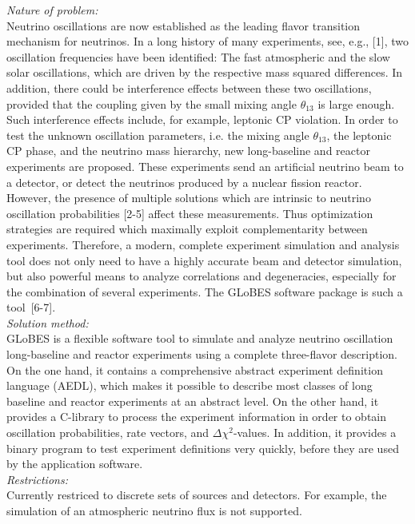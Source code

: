 \documentclass{elsart}
\begin{document}
\begin{small}
{\em Nature of problem:}\\
  Neutrino oscillations are now established as the leading flavor
transition mechanism for neutrinos. In a long history of many experiments, see, e.g., [1], two
oscillation frequencies have been identified: The fast atmospheric and the slow solar
oscillations, which are driven by the respective mass squared differences. In addition, there could be
interference effects between these two oscillations, provided that the coupling given by the small
mixing angle $\theta_{13}$ is large enough. Such interference effects include, for example, leptonic
CP violation. In order to test the unknown oscillation parameters, i.e. the mixing angle
$\theta_{13}$, the leptonic CP phase, and the neutrino mass hierarchy, new long-baseline and reactor
experiments are proposed. These experiments send an artificial neutrino beam to a detector, or detect
the neutrinos produced by a nuclear fission reactor. However, the presence of multiple solutions which
are intrinsic to neutrino oscillation probabilities [2-5] affect these measurements. Thus optimization
strategies are required which maximally exploit complementarity between experiments. Therefore, a
modern, complete experiment simulation and analysis tool does not only need to have a highly accurate
beam and detector simulation, but also powerful means to analyze correlations and degeneracies,
especially for the combination of several experiments. The GLoBES software package is such a
tool~[6-7].
   \\
{\em Solution method:}\\
   GLoBES is a flexible software tool to simulate and analyze
neutrino oscillation long-baseline and reactor experiments using a
complete three-flavor description. On the one hand, it contains a
comprehensive abstract experiment definition language (AEDL), which
makes it possible to describe most classes of long baseline and
reactor experiments at an abstract level. On the other hand, it
provides a C-library to process the experiment information in order
to obtain oscillation probabilities, rate vectors, and
$\Delta {\chi^{2}}$-values. In addition, it provides a binary
program to test experiment definitions very quickly, before they are
used by the application software.
   \\
{\em Restrictions:}\\
  Currently restriced to discrete sets of sources and detectors. For example, the
simulation of an atmospheric neutrino flux is not supported. 

\end{small}
\end{document}

